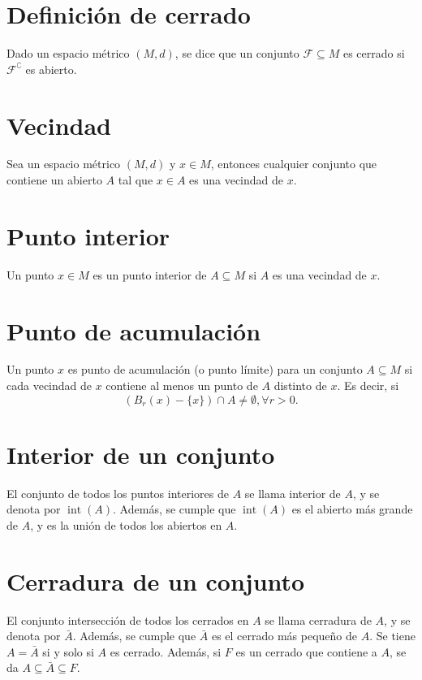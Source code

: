 \documentclass{article}
\DeclareMathOperator{\interior}{int}
\begin{document}
\section*{Definición de cerrado}

Dado un espacio métrico $(M,d)$, se dice que un conjunto $\mathcal{F}\subseteq M$ es cerrado si $\mathcal{F}^{\complement}$ es abierto.

\section*{Vecindad}

Sea un espacio métrico $(M,d)$ y $x\in M$, entonces cualquier conjunto que contiene un abierto $A$ tal que $x\in A$ es una vecindad de $x$.

\section*{Punto interior}

Un punto $x\in M$ es un punto interior de $A\subseteq M$ si $A$ es una vecindad de $x$.

\section*{Punto de acumulación}

Un punto $x$ es punto de acumulación (o punto límite) para un conjunto $A\subseteq M$ si cada vecindad de $x$ contiene al menos un punto de $A$ distinto de $x$. Es decir, si
\[(B_r(x)-\{x\})\cap A\neq\emptyset,\forall r>0.\]

\section*{Interior de un conjunto}

El conjunto de todos los puntos interiores de $A$ se llama interior de $A$, y se denota por $\interior(A)$. Además, se cumple que $\interior(A)$ es el abierto más grande de $A$, y es la unión de todos los abiertos en $A$.

\section*{Cerradura de un conjunto}

El conjunto intersección de todos los cerrados en $A$ se llama cerradura de $A$, y se denota por $\bar{A}$. Además, se cumple que $\bar{A}$ es el cerrado más pequeño de $A$. Se tiene $A=\bar{A}$ si y solo si $A$ es cerrado. Además, si $F$ es un cerrado que contiene a $A$, se da $A\subseteq \bar{A}\subseteq F$.
\end{document}
